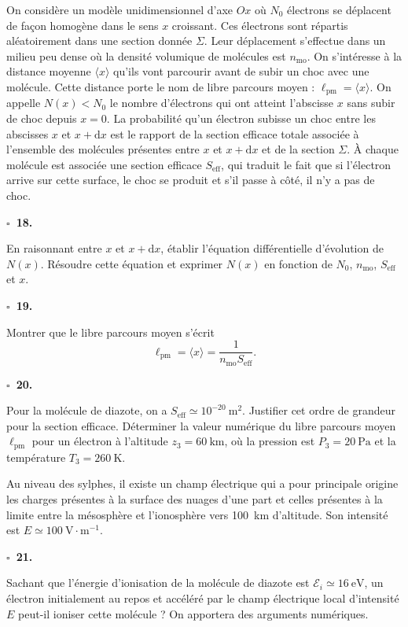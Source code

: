 \documentclass[11pt,a4paper]{article}
\newcommand{\question}[1]{%
  \par\medskip\noindent\textbf{\(\square\)\ #1.}\quad%
}
\begin{document}
On considère un modèle unidimensionnel d'axe \(Ox\) où \(N_0\) électrons se déplacent de façon homogène dans le sens \(x\) croissant. Ces électrons sont répartis aléatoirement dans une section donnée \(\Sigma\). Leur déplacement s'effectue dans un milieu peu dense où la densité volumique de molécules est \(n_{\mathrm{mo}}\). On s'intéresse à la distance moyenne \(\langle x\rangle\) qu'ils vont parcourir avant de subir un choc avec une molécule. Cette distance porte le nom de libre parcours moyen : \(\ell_{\mathrm{pm}}=\langle x\rangle\). On appelle \(N(x)<N_0\) le nombre d'électrons qui ont atteint l'abscisse \(x\) sans subir de choc depuis \(x=0\). La probabilité qu'un électron subisse un choc entre les abscisses \(x\) et \(x+\mathrm{d}x\) est le rapport de la section efficace totale associée à l'ensemble des molécules présentes entre \(x\) et \(x+\mathrm{d}x\) et de la section \(\Sigma\). À chaque molécule est associée une section efficace \(S_{\mathrm{eff}}\), qui traduit le fait que si l'électron arrive sur cette surface, le choc se produit et s'il passe à côté, il n'y a pas de choc.

\question{18}
En raisonnant entre \(x\) et \(x+\mathrm{d}x\), établir l'équation différentielle d'évolution de \(N(x)\). Résoudre cette équation et exprimer \(N(x)\) en fonction de \(N_0\), \(n_{\mathrm{mo}}\), \(S_{\mathrm{eff}}\) et \(x\).

\question{19}
Montrer que le libre parcours moyen s'écrit
\[
\ell_{\mathrm{pm}}=\langle x\rangle=\frac{1}{n_{\mathrm{mo}}S_{\mathrm{eff}}}.
\]

\question{20}
Pour la molécule de diazote, on a \(S_{\mathrm{eff}}\simeq 10^{-20}~\mathrm{m}^2\). Justifier cet ordre de grandeur pour la section efficace. Déterminer la valeur numérique du libre parcours moyen \(\ell_{\mathrm{pm}}\) pour un électron à l'altitude \(z_3=60~\mathrm{km}\), où la pression est \(P_3=20~\mathrm{Pa}\) et la température \(T_3=260~\mathrm{K}\).

Au niveau des sylphes, il existe un champ électrique qui a pour principale origine les charges présentes à la surface des nuages d'une part et celles présentes à la limite entre la mésosphère et l'ionosphère vers 100~km d'altitude. Son intensité est \(E\simeq 100~\mathrm{V}\cdot\mathrm{m}^{-1}\).

\question{21}
Sachant que l'énergie d'ionisation de la molécule de diazote est \(\mathcal{E}_i\simeq 16~\mathrm{eV}\), un électron initialement au repos et accéléré par le champ électrique local d'intensité \(E\) peut-il ioniser cette molécule ? On apportera des arguments numériques.
\end{document}
